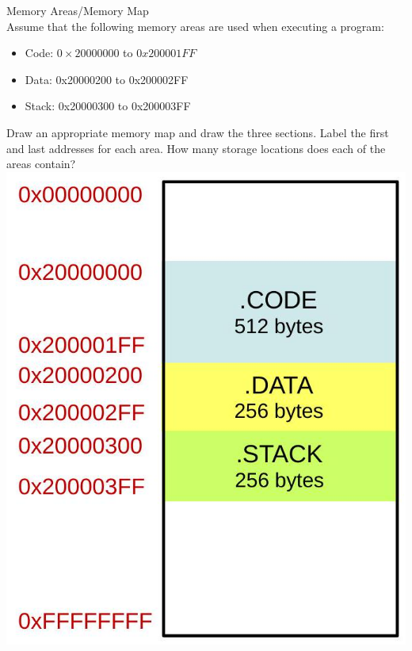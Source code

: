 \begin{example2}{Memory Areas/Memory Map}\\
Assume that the following memory areas are used when executing a program:

\begin{itemize}
  \item Code: $0 \times 20000000$ to $0 x 200001 F F$
  \item Data: 0x20000200 to 0x200002FF
  \item Stack: 0x20000300 to 0x200003FF
\end{itemize}

Draw an appropriate memory map and draw the three sections. Label the first and last addresses for each area. How many storage locations does each of the areas contain?\\

\includegraphics[width=0.6\linewidth]{images/2025_01_02_5d04f07cd96c1366bf1bg-5}
\end{example2}

